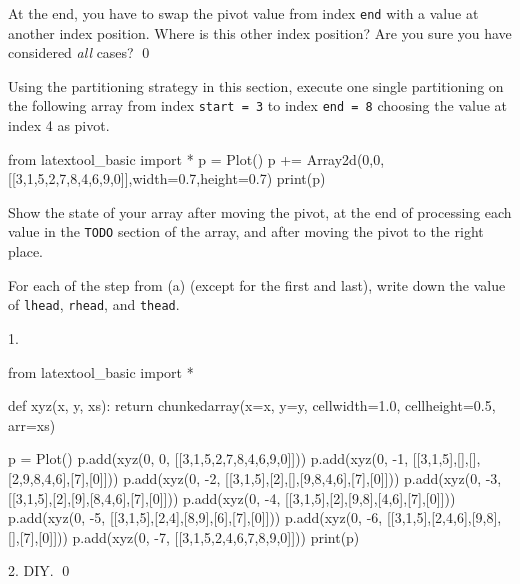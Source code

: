 \newpage
\begin{ex}
At the end, you have to swap the pivot value from index \verb!end! 
with a value at another index position.
Where is this other index position?
Are you sure you have considered \textit{all} cases?
\qed
\end{ex}


\newpage
\begin{ex}
\begin{tightlist}
\item Using the partitioning strategy in this section,
execute one single partitioning on the following array
from index \verb!start = 3! to index \verb!end = 8!
choosing the value at index 4 as pivot.

\begin{python}
from latextool_basic import *
p = Plot()
p += Array2d(0,0,[[3,1,5,2,7,8,4,6,9,0]],width=0.7,height=0.7)
print(p)
\end{python}

Show the state of your array after moving the pivot, at the end of
processing each value in the \verb!TODO! section of the array,
and after moving the pivot to the right place.
\item For each of the step from (a) (except for the first and last),
write down the value of \verb!lhead!, \verb!rhead!, and \verb!thead!.
\end{tightlist}
\end{ex}

\SOLUTION

1.
\begin{python}
from latextool_basic import *

def xyz(x, y, xs):
    return chunkedarray(x=x, y=y, cellwidth=1.0, cellheight=0.5, arr=xs)

p = Plot()
p.add(xyz(0,  0, [[3,1,5,2,7,8,4,6,9,0]]))
p.add(xyz(0, -1, [[3,1,5],[],[],[2,9,8,4,6],[7],[0]]))
p.add(xyz(0, -2, [[3,1,5],[2],[],[9,8,4,6],[7],[0]]))
p.add(xyz(0, -3, [[3,1,5],[2],[9],[8,4,6],[7],[0]]))
p.add(xyz(0, -4, [[3,1,5],[2],[9,8],[4,6],[7],[0]]))
p.add(xyz(0, -5, [[3,1,5],[2,4],[8,9],[6],[7],[0]]))
p.add(xyz(0, -6, [[3,1,5],[2,4,6],[9,8],[],[7],[0]]))
p.add(xyz(0, -7, [[3,1,5,2,4,6,7,8,9,0]]))
print(p)
\end{python}

2. DIY.
\qed


